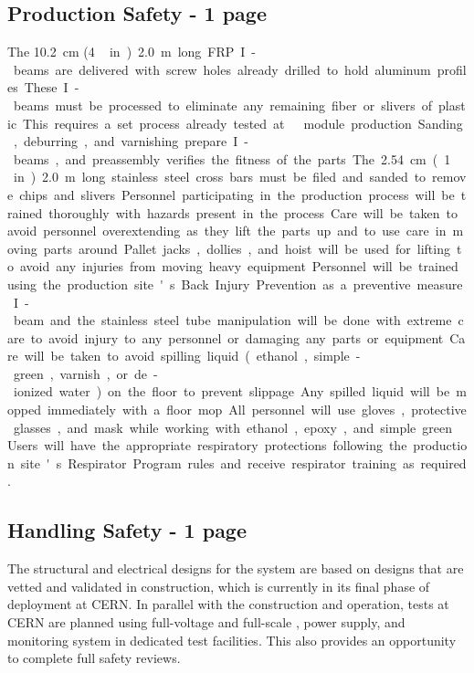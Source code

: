 \subsection{Production Safety - 1 page}
\label{sec:fddp-hv-prod-safety}

The \SI{10.2}{\cm} (\SI{4}\,in) \SI{2.0}{\m} long FRP I-beams are delivered with screw holes already drilled to hold aluminum profiles.
These I-beams must be processed to eliminate any remaining fiber or slivers of plastic.
This requires a set process already tested at   module production.
Sanding, deburring, and varnishing prepare I-beams, and preassembly verifies the fitness of the parts. 
The \SI{2.54}{\cm} (\SI{1}\,in) \SI{2.0}{\m} long stainless steel cross bars must be filed and sanded to remove chips and slivers.

Personnel participating in the production process will be trained thoroughly with hazards present in the process.  
Care will be taken to avoid personnel overextending as they lift the parts up and to use care in moving parts around. 
Pallet jacks, dollies, and hoist will be used for lifting to avoid any injuries from moving heavy equipment. 
Personnel will be trained using the production site's Back Injury Prevention as a preventive measure.
I-beam and the stainless steel tube manipulation will be done with extreme care to avoid injury to any personnel or damaging any parts or equipment. 
Care will be taken to avoid spilling liquid (ethanol, simple-green, varnish, or de-ionized water) on the floor to prevent slippage. 
Any spilled liquid will be mopped immediately with a floor mop.
All personnel will use gloves, protective glasses, and mask while
working with ethanol, epoxy, and simple green. 
Users will have the appropriate respiratory protections following the production site's Respirator Program rules and receive respirator training as
required.

\subsection{Handling Safety -  1 page}
\label{sec:fddp-hv-transport-safety}

The structural and electrical designs for the   system are based on designs that are vetted and validated in  construction, which is currently in its final phase of deployment at CERN. In parallel with the  construction and operation,  tests at CERN are planned using %
full-voltage and full-scale  \fdth, power supply, and monitoring system in dedicated  test facilities. This also provides an opportunity %
to complete full safety reviews. 

